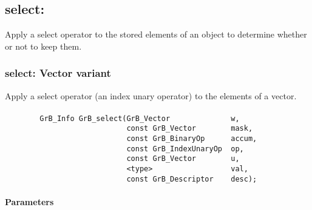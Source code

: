 
\subsection{{\sf select}:} Apply a select operator to the stored elements of an 
object to determine whether or not to keep them.


\subsubsection{{\sf select}: Vector variant} 

Apply a select operator (an index unary operator) to the elements of a vector.

\paragraph{\syntax}

\begin{verbatim}
        GrB_Info GrB_select(GrB_Vector              w,
                            const GrB_Vector        mask,
                            const GrB_BinaryOp      accum,
                            const GrB_IndexUnaryOp  op,
                            const GrB_Vector        u,
                            <type>                  val,
                            const GrB_Descriptor    desc);
\end{verbatim}

\paragraph{Parameters}

